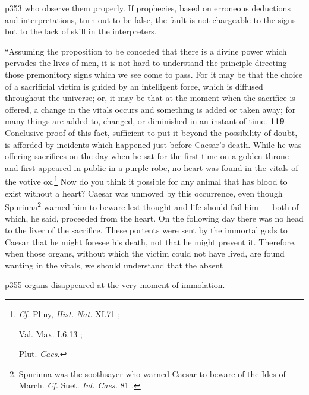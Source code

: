 p353 who observe them properly. If prophecies, based on erroneous deductions and interpretations, turn out to be false, the fault is not chargeable to the signs but to the lack of skill in the interpreters.

``Assuming the proposition to be conceded that there is a divine power which pervades the lives of men, it is not hard to understand the principle directing those premonitory signs which we see come to pass. For it may be that the choice of a sacrificial victim is guided by an intelligent force, which is diffused throughout the universe; or, it may be that at the moment when the sacrifice is offered, a change in the vitals occurs and something is added or taken away; for many things are added to, changed, or diminished in an instant of time. \textbf{119} Conclusive proof of this fact, sufficient to put it beyond the possibility of doubt, is afforded by incidents which happened just before Caesar's death. While he was offering sacrifices on the day when he sat for the first time on a golden throne and first appeared in public in a purple robe, no heart was found in the vitals of the votive ox.\texthebrew{}\footnote{\emph{Cf.} Pliny, \emph{Hist. Nat.} XI.71 ;

Val. Max. I.6.13 ;

Plut. \emph{Caes.}

} Now do you think it possible for any animal that has blood to exist without a heart? Caesar was unmoved by this occurrence, even though Spurinna\texthebrew{}\footnote{Spurinna was the soothsayer who warned Caesar to beware of the Ides of March. \emph{Cf.} Suet. \emph{Iul. Caes.} 81 .

} warned him to beware lest thought and life should fail him \texthebrew{—} both of which, he said, proceeded from the heart. On the following day there was no head to the liver of the sacrifice. These portents were sent by the immortal gods to Caesar that he might foresee his death, not that he might prevent it. Therefore, when those organs, without which the victim could not have lived, are found wanting in the vitals, we should understand that the absent

p355 organs disappeared at the very moment of immolation.

